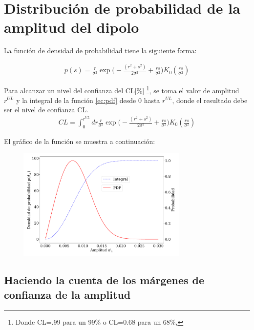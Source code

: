 \documentclass[11pt,papel,oneside,singlespace]{ibtesis}
\begin{document}
\section{Distribución de probabilidad de la amplitud del dipolo}

La función de densidad de probabilidad tiene la siguiente forma:

\begin{align}
    p(s) =\frac{r}{\sigma^2}\exp{\Big( -\frac{(r^2+s^2)}{2\sigma^2} + \frac{rs}{\sigma^2}\Big)}K_0(\frac{rs}{\sigma^2})    \label{ec:pdf}
\end{align}    

Para alcanzar un  nivel del confianza  del  CL[\%] \footnote{ Donde CL=.99 para un 99\% o CL=0.68 para un 68\%,},  se toma el valor de amplitud $r^{UL}$ y la integral de la función \ref{ec:pdf} desde 0 hasta $r^{UL}$, donde el resultado debe ser el nivel de confianza CL.
\begin{align}
    CL = \int_{0}^{r^{UL}} dr \frac{r}{\sigma^2}\exp{\Big( -\frac{(r^2+s^2)}{2\sigma^2} + \frac{rs}{\sigma^2}\Big)}K_0(\frac{rs}{\sigma^2})
    \label{ec:integral}
\end{align}

El gráfico de la función se muestra a continuación:

\begin{figure}[H]
    \begin{small}
        \begin{center}
            \includegraphics[width=0.75\textwidth]{bessel_prob.pdf}
        \end{center}
        \caption{}
    \end{small}
\end{figure}


\subsection{Haciendo la cuenta de los márgenes de confianza de la amplitud}
\end{document}
